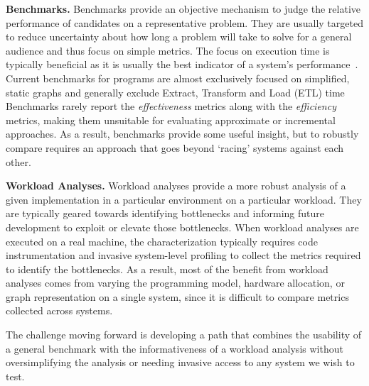 \textbf{Benchmarks.}
Benchmarks provide an objective mechanism to judge the relative performance of candidates on a representative problem.
They are usually targeted to reduce uncertainty about how long a problem will take to solve for a general audience and thus focus on simple metrics.
The focus on execution time is typically beneficial as it is usually the best indicator of a system's performance~\cite{Hennessy2019}.
Current benchmarks for \gai programs are almost exclusively focused on simplified, static graphs and generally exclude Extract, Transform and Load (ETL) time
Benchmarks rarely report the \textit{effectiveness} metrics along with the \textit{efficiency} metrics, making them unsuitable for evaluating approximate or incremental approaches.  
As a result, benchmarks provide some useful insight, but to robustly compare \gai requires an approach that goes beyond `racing' systems against each other.

\textbf{Workload Analyses.}
Workload analyses provide a more robust analysis of a given implementation in a particular environment on a particular workload. 
They are typically geared towards identifying bottlenecks and informing future development to exploit or elevate those bottlenecks. 
When workload analyses are executed on a real machine, the characterization typically requires code instrumentation and invasive system-level profiling to collect the metrics required to identify the bottlenecks. 
As a result, most of the benefit from workload analyses comes from varying the programming model, hardware allocation, or graph representation on a single system, since it is difficult to compare metrics collected across systems.

The challenge moving forward is developing a path that combines the usability of a general benchmark with the informativeness of a workload analysis without oversimplifying the analysis or needing invasive access to any system we wish to test. 







